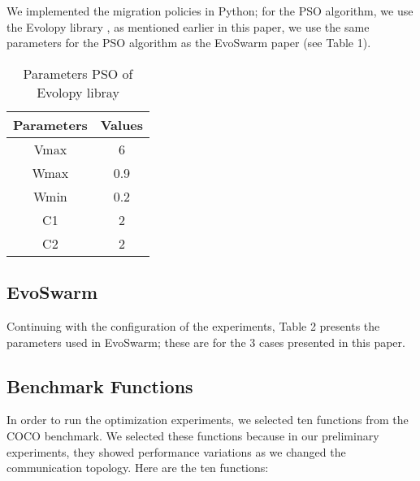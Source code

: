 \documentclass[runningheads]{llncs}
\begin{document}

We implemented the migration policies in Python; for the PSO algorithm, we use the Evolopy library \cite{b19}, as mentioned
earlier in this paper, we use the same parameters for the PSO algorithm as the
EvoSwarm paper (see Table 1).

\begin{table}[h!]
\centering
\caption{Parameters PSO of Evolopy libray}
\begin{tabular}{|c c|} 
 \hline
 Parameters & Values  \\ [0.5ex] 
 \hline\hline
 Vmax & 6 \\ 
 Wmax & 0.9 \\
 Wmin & 0.2 \\
C1 & 2 \\
C2 & 2 \\[0.5ex]
 \hline
\end{tabular}
\label{table:1}
\end{table}

\subsection{EvoSwarm} 

Continuing with the configuration of the experiments, Table 2 presents the
parameters used in EvoSwarm; these are for the 3 cases presented in this paper.

\begin{table}[h]
\centering
\caption{Parameters for EvoSwarm}
\label{table:1}
\end{table}

\subsection{Benchmark Functions}

In order to run the optimization experiments, we selected ten functions from the
COCO benchmark. We selected these functions because in our preliminary
experiments, they showed performance variations as we changed the communication
topology. Here are the ten functions:
\end{document}
